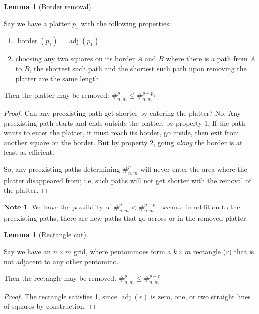 \documentclass{article}
\theoremstyle{definition}%
\newtheorem{lemma}[theorem]{Lemma}
\newtheorem*{note}{Note}
\newcommand{\adj}{\operatorname{adj}}
\newcommand{\border}{\operatorname{border}}
\begin{document}
\begin{lemma}[Border removal]
\label{lem:Border removal}

Say we have a platter $p_1$ with the following properties:

\begin{enumerate}
\item $\border(p_1) = \adj(p_1)$
\item choosing any two squares on its border $A$ and $B$ where there is a path from $A$ to $B$, the shortest such path and the shortest such path upon removing the platter are the same length.
\end{enumerate}

Then the platter may be removed: $\#^{p}_{n, m} \le \#^{p - p_1}_{n, m}$
\end{lemma}

\begin{proof}
Can any preexisting path get shorter by entering the platter? No. Any preexisting path starts and ends outside the platter, by property 1. If the path wants to enter the platter, it must reach its border, go inside, then exit from another square on the border. But by property 2, going \emph{along} the border is at least as efficient.

So, any preexisting paths determining $\#^{p}_{n, m}$ will never enter the area where the platter disappeared from; i.e, such paths will not get shorter with the removal of the platter.
\end{proof}

\begin{note}
We have the possibility of $\#^{p}_{n, m} < \#^{p - p_1}_{n, m}$ because in addition to the preexisting paths, there are new paths that go across or in the removed platter.
\end{note}

\begin{lemma}[Rectangle cut]
\label{lem:Rectangle cut}

Say we have an $n \times m$ grid, where pentominoes form a $k \times m$ rectangle ($r$) that is not adjacent to any other pentomino.

Then the rectangle may be removed: $\#^{p}_{n, m} \le \#^{p - r}_{n, m}$
\end{lemma}

\begin{proof}
The rectangle satisfies \cref{lem:Border removal}, since $\adj(r)$ is zero, one, or two straight lines of squares by construction.
\end{proof}
\end{document}

